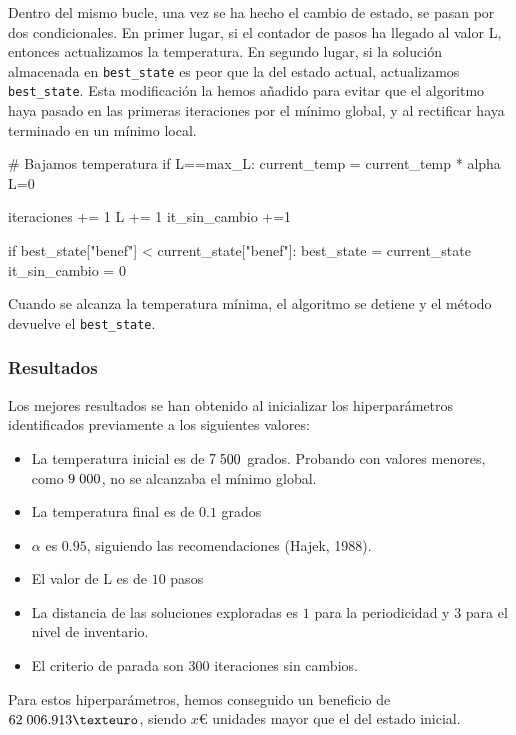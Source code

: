 \documentclass[a4paper,12pt]{article}
\begin{document}
	Dentro del mismo bucle, una vez se ha hecho el cambio de estado, se pasan por dos condicionales. En primer lugar, si el contador de pasos ha llegado al valor L, entonces
	actualizamos la temperatura. En segundo lugar, si la solución almacenada en \texttt{best\_state} es peor que la del estado actual, actualizamos \texttt{best\_state}.
	Esta modificación la hemos añadido para evitar que el algoritmo haya pasado en las primeras iteraciones por el mínimo global, y al rectificar haya terminado en un mínimo local.

	\begin{python}
	# Bajamos temperatura
	if L==max_L:
		current_temp = current_temp * alpha
		L=0
	
	iteraciones += 1
	L += 1
	it_sin_cambio +=1 
	
	if best_state["benef"] < current_state["benef"]:
		best_state = current_state		it_sin_cambio = 0
	\end{python}

	Cuando se alcanza la temperatura mínima, el algoritmo se detiene y el método devuelve el \texttt{best\_state}.

	
	\subsubsection{Resultados}
	Los mejores resultados se han obtenido al inicializar los hiperparámetros identificados previamente a los siguientes valores:
	\begin{itemize}
		\item La temperatura inicial es de $7\hspace{1mm}500$ grados. Probando con valores menores, como $9\hspace{1mm}000$, no se alcanzaba el mínimo global.
		\item La temperatura final es de $0.1$ grados
		\item $\alpha$ es $0.95$, siguiendo las recomendaciones (Hajek, 1988).
		\item El valor de L es de $10$ pasos
		\item La distancia de las soluciones exploradas es $1$ para la periodicidad y $3$ para el nivel de inventario.
		\item El criterio de parada son $300$ iteraciones sin cambios.
	\end{itemize}
	Para estos hiperparámetros, hemos conseguido un beneficio de $62\hspace{1mm}006.913€$, siendo $x€$ unidades mayor que el del estado inicial. 
	
\end{document}
